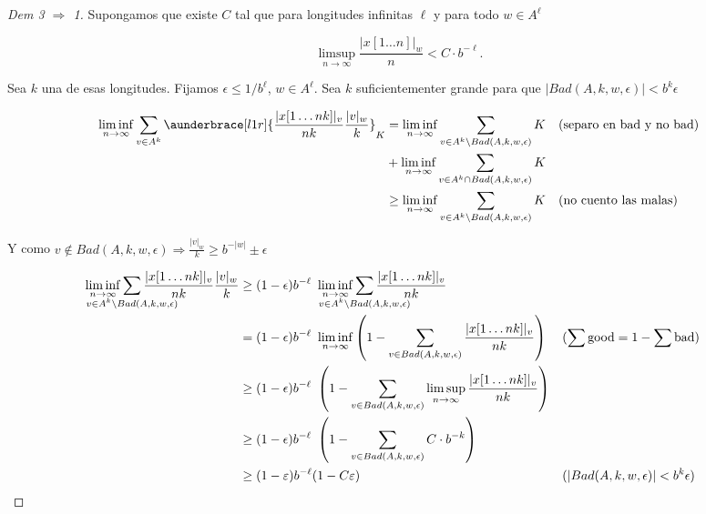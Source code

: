 \documentclass{report}
\theoremstyle{definition} %
\begin{document}
\begin{proof}[Dem 3 $\Rightarrow$ 1]
    Supongamos que existe $C$ tal que para longitudes infinitas $\ell$ y para
    todo $w \in A^\ell$

    $$
    \limsup_{n\to\infty}
    \frac{|x[1\dots n]|_w}{n} < C \cdot b^{-\ell}.
    $$

    Sea $k$ una de esas longitudes. Fijamos $\epsilon \leq 1/b^{\ell}$, $w
    \in A^\ell$. Sea $k$ suficientementer grande para que $|Bad(A, k, w,
    \epsilon)| < b^k \epsilon$

    \begin{align*}
        \liminf_{n\to \infty}
            \sum_{v \in A^k}
            \aunderbrace[l1r]{\frac{|x[1\dots nk]|_v}{nk} \frac{|v|_w}{k}}_{K}
        &= \liminf_{n\to \infty}
            \sum_{v \in A^k \setminus Bad(A, k, w, \epsilon)} K
        &&\text{(separo en bad y no bad)} \\
        &+ \liminf_{n\to \infty}
        \sum_{v \in A^k \cap Bad(A, k, w, \epsilon)} K \\
        &\geq \liminf_{n\to \infty}
        \sum_{v \in A^k \setminus Bad(A, k, w, \epsilon)} K
        &&\text{(no cuento las malas)}
    \end{align*}

    Y como $v \notin Bad(A, k, w, \epsilon) \Rightarrow \frac{|v|_w}{k} \geq
    b^{-|w|} \pm \epsilon$
    
    \begin{align*}
        \liminf_{n\to \infty}
        \sum_{\mathclap{v \in A^k \setminus Bad(A, k, w, \epsilon)}}
            \frac{|x[1\dots nk]|_v}{nk} \frac{|v|_w}{k}
        &\geq (1 - \epsilon) b^{-\ell}\ \liminf_{n\to \infty}
            \sum_{\mathclap{v \in A^k \setminus Bad(A, k, w, \epsilon)}}
            \frac{|x[1\dots nk]|_v}{nk} \\
        &= (1 - \epsilon) b^{-\ell}\ \liminf_{n\to \infty}
        \left( 1 -\sum_{v \in Bad(A, k, w, \epsilon)}
        \frac{|x[1\dots nk]|_v}{nk} \right)
        && (\sum \text{good} = 1 - \sum \text{bad}) \\
        &\geq (1 - \epsilon) b^{-\ell}\
            \left( 1 -
                \sum_{v \in Bad(A, k, w, \epsilon)}
                \limsup_{n\to \infty}
                \frac{|x[1\dots nk]|_v}{nk}
            \right)\\
        &\geq (1 - \epsilon) b^{-\ell}\
        \left( 1 -
            \sum_{v \in Bad(A, k, w, \epsilon)} C \cdot b^{-k}
        \right) \\
        &\geq (1 - \varepsilon) b^{-\ell}(1 - C\varepsilon)
        &&(|Bad(A, k, w, \epsilon)| < b^k \epsilon)
    \end{align*}


\end{proof}
\end{document}
